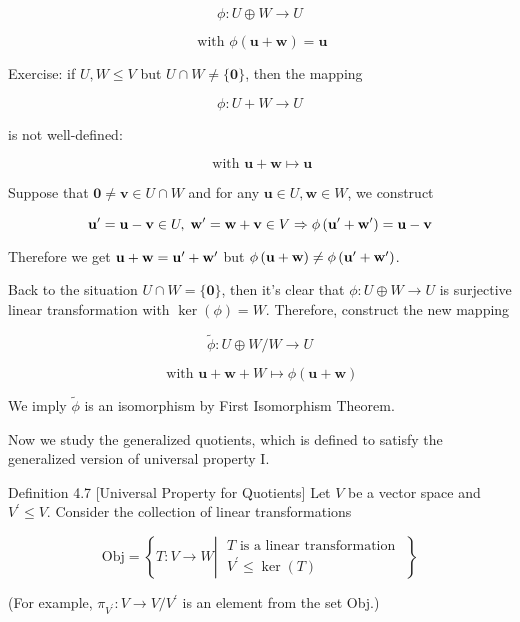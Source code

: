 \documentclass[11pt]{article}
\begin{document}
\[
\phi  : U \oplus  W \rightarrow  U
\]

\[
\text{ with }\phi \left( {\mathbf{u} + \mathbf{w}}\right)  = \mathbf{u}
\]

Exercise: if \(U,W \leq  V\) but \(U \cap  W \neq  \{ \mathbf{0}\}\), then the mapping

\[
\phi  : U + W \rightarrow  U
\]

is not well-defined:

\[
\text{ with }\mathbf{u} + \mathbf{w} \mapsto  \mathbf{u}
\]

Suppose that \(\mathbf{0} \neq  \mathbf{v} \in  U \cap  W\) and for any \(\mathbf{u} \in  U,\mathbf{w} \in  W\), we construct

\[
{\mathbf{u}}^{\prime } = \mathbf{u} - \mathbf{v} \in  U,\;{\bf w}^{\prime } = \mathbf{w} + \mathbf{v} \in  V \Rightarrow  \phi \left( {{\mathbf{u}}^{\prime } + {\bf w}^{\prime }}\right)  = \mathbf{u} - \mathbf{v}
\]

Therefore we get \(\mathbf{u} + \mathbf{w} = {\mathbf{u}}^{\prime } + {\bf w}^{\prime }\) but \(\phi \left( {\mathbf{u} + \mathbf{w}}\right)  \neq  \phi \left( {{\mathbf{u}}^{\prime } + {\bf w}^{\prime }}\right)\).

Back to the situation \(U \cap  W = \{ \mathbf{0}\}\), then it’s clear that \(\phi  : U \oplus  W \rightarrow  U\) is surjective linear transformation with \(\ker \left( \phi \right)  = W\). Therefore, construct the new mapping

\[
\widetilde{\phi } : U \oplus  W/W \rightarrow  U
\]

\[
\text{ with }\mathbf{u} + \mathbf{w} + W \mapsto  \phi \left( {\mathbf{u} + \mathbf{w}}\right)
\]

We imply \(\widetilde{\phi }\) is an isomorphism by First Isomorphism Theorem.

Now we study the generalized quotients, which is defined to satisfy the generalized version of universal property I.

Definition 4.7 [Universal Property for Quotients] Let \(V\) be a vector space and \({V}^{\prime } \leq  V\). Consider the collection of linear transformations

\[
\mathrm{{Obj}} = \left\{  {T : V \rightarrow  W\left| {\;\begin{array}{l} T\text{ is a linear transformation } \\  {V}^{\prime } \leq  \ker \left( T\right)  \end{array}}\right. }\right\}
\]

(For example, \({\pi }_{{V}^{\prime }} : V \rightarrow  V/{V}^{\prime }\) is an element from the set Obj.)
\end{document}
